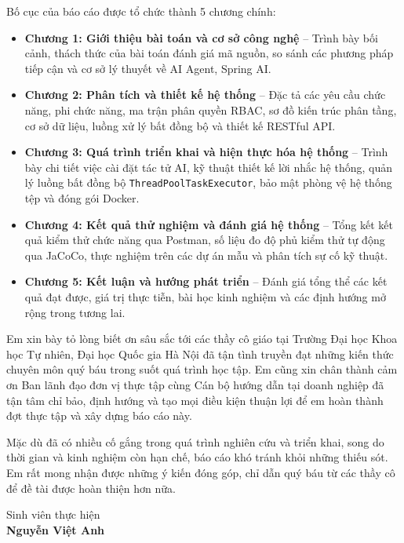 \documentclass[12pt,a4paper]{report}
\begin{document}
Bố cục của báo cáo được tổ chức thành 5 chương chính:
\begin{itemize}
    \item \textbf{Chương 1: Giới thiệu bài toán và cơ sở công nghệ} -- Trình bày bối cảnh, thách thức của bài toán đánh giá mã nguồn, so sánh các phương pháp tiếp cận và cơ sở lý thuyết về AI Agent, Spring AI.
    \item \textbf{Chương 2: Phân tích và thiết kế hệ thống} -- Đặc tả các yêu cầu chức năng, phi chức năng, ma trận phân quyền RBAC, sơ đồ kiến trúc phân tầng, cơ sở dữ liệu, luồng xử lý bất đồng bộ và thiết kế RESTful API.
    \item \textbf{Chương 3: Quá trình triển khai và hiện thực hóa hệ thống} -- Trình bày chi tiết việc cài đặt tác tử AI, kỹ thuật thiết kế lời nhắc hệ thống, quản lý luồng bất đồng bộ \texttt{ThreadPoolTaskExecutor}, bảo mật phòng vệ hệ thống tệp và đóng gói Docker.
    \item \textbf{Chương 4: Kết quả thử nghiệm và đánh giá hệ thống} -- Tổng kết kết quả kiểm thử chức năng qua Postman, số liệu đo độ phủ kiểm thử tự động qua JaCoCo, thực nghiệm trên các dự án mẫu và phân tích sự cố kỹ thuật.
    \item \textbf{Chương 5: Kết luận và hướng phát triển} -- Đánh giá tổng thể các kết quả đạt được, giá trị thực tiễn, bài học kinh nghiệm và các định hướng mở rộng trong tương lai.
\end{itemize}

Em xin bày tỏ lòng biết ơn sâu sắc tới các thầy cô giáo tại Trường Đại học Khoa học Tự nhiên, Đại học Quốc gia Hà Nội đã tận tình truyền đạt những kiến thức chuyên môn quý báu trong suốt quá trình học tập. Em cũng xin chân thành cảm ơn Ban lãnh đạo đơn vị thực tập cùng Cán bộ hướng dẫn tại doanh nghiệp đã tận tâm chỉ bảo, định hướng và tạo mọi điều kiện thuận lợi để em hoàn thành đợt thực tập và xây dựng báo cáo này.

Mặc dù đã có nhiều cố gắng trong quá trình nghiên cứu và triển khai, song do thời gian và kinh nghiệm còn hạn chế, báo cáo khó tránh khỏi những thiếu sót. Em rất mong nhận được những ý kiến đóng góp, chỉ dẫn quý báu từ các thầy cô để đề tài được hoàn thiện hơn nữa.

\vspace{1cm}
\begin{flushright}
Sinh viên thực hiện \\
\textbf{Nguyễn Việt Anh}
\end{flushright}
\newpage

\tableofcontents
\cleardoublepage
\end{document}
